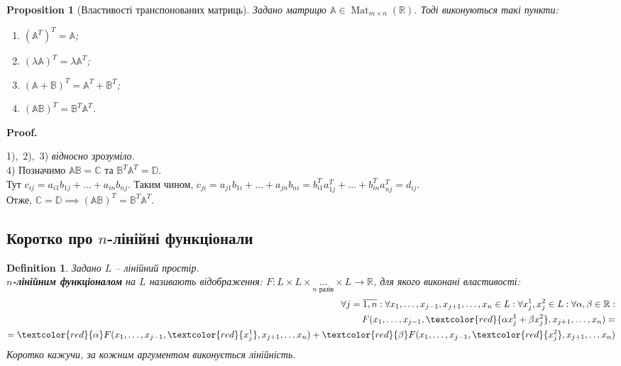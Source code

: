 \documentclass[a4paper, 10pt]{article}
\makeatletter
\theoremstyle{theoremdd}
\newtheorem{definition}[theorem]{Definition}
\newtheorem{proposition}[theorem]{Proposition}
\DeclareMathOperator{\Mat}{Mat}
\renewenvironment{proof}[1][Proof.\\]{\par
\pushQED{\hfill \qed}%
\normalfont \topsep6\p@\@plus6\p@\relax
\trivlist
\item\relax
{\bfseries
#1\@addpunct{.}}\hspace\labelsep\ignorespaces
}{%
\popQED\endtrivlist\@endpefalse
}
\makeatother
\begin{document}
	\begin{proposition}[Властивості транспонованих матриць]
	Задано матрицю $\mathbb{A} \in \Mat_{m \times n}(\mathbb{R})$. Тоді виконуються такі пункти:
	\begin{enumerate}[nosep, wide=0pt, label={\arabic*)}]
	\item $(\mathbb{A}^T)^T = \mathbb{A}$;
	\item $(\lambda \mathbb{A})^T = \lambda \mathbb{A}^T$;
	\item $(\mathbb{A} + \mathbb{B})^T = \mathbb{A}^T + \mathbb{B}^T$;
	\item $(\mathbb{A} \mathbb{B})^T = \mathbb{B}^T \mathbb{A}^T$.
	\end{enumerate}
	\end{proposition}
	
	\begin{proof}
	1),\ 2),\ 3) \textit{відносно зрозуміло.}\\
	4) Позначимо $\mathbb{A} \mathbb{B} = \mathbb{C}$ та $\mathbb{B}^T \mathbb{A}^T = \mathbb{D}$.\\
	Тут $c_{ij} = a_{i1}b_{1j} + \dots + a_{in}b_{nj}$. Таким чином, $c_{ji} = a_{j1}b_{1i} + \dots + a_{jn}b_{ni} = b_{i1}^T a_{1j}^T + \dots + b_{in}^T a_{nj}^T = d_{ij}$.\\
	Отже, $\mathbb{C} = \mathbb{D} \implies (\mathbb{A} \mathbb{B})^T = \mathbb{B}^T \mathbb{A}^T$.
	\end{proof}

	
	\subsection{Коротко про $n$-лінійні функціонали}
	\begin{definition}
	\label{def_polylinear_functional}
	Задано $L$ -- лінійний простір.\\
	\textbf{$n$-лінійним функціоналом} на $L$ називають відображення: $F \colon L \times L \times \underset{n\text{ разів}}{\dots} \times L \to \mathbb{R}$, для якого виконані властивості:
	\begin{align*}
	\forall j = \overline{1,n}: \forall x_1,\dots,x_{j-1}, x_{j+1}, \dots, x_n \in L: \forall x_j^1, x_j^2 \in L: \forall \alpha, \beta \in \mathbb{R}:\\
	F(x_1,\dots,x_{j-1}, \textcolor{red}{\alpha x_j^1 + \beta x_j^2}, x_{j+1}, \dots, x_n) = \\ = \textcolor{red}{\alpha} F(x_1, \dots, x_{j-1}, \textcolor{red}{x_j^1}, x_{j+1}, \dots x_n) + \textcolor{red}{\beta} F(x_1, \dots, x_{j-1}, \textcolor{red}{x_j^2}, x_{j+1}, \dots x_n)
	\end{align*}
	Коротко кажучи, за кожним аргументом виконується лінійність.
	\end{definition}
	
\end{document}
